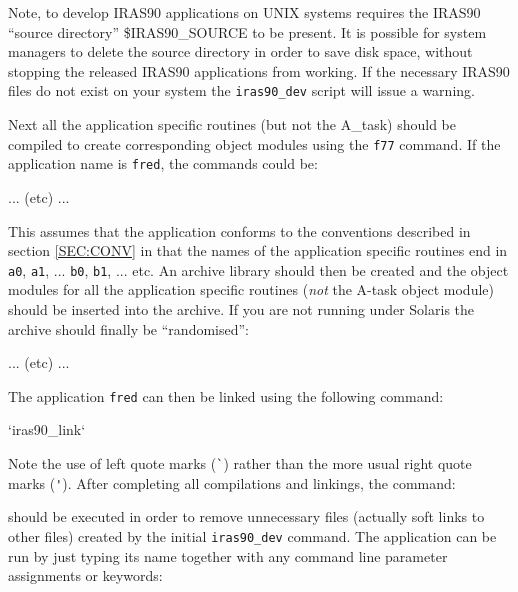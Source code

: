 \documentclass[twoside,11pt,nolof]{starlink}
\begin{document}
Note, to develop {\small IRAS90} applications on {\small UNIX} systems
requires the {\small IRAS90} ``source directory'' {\small \$IRAS90\_SOURCE}
to be present. It is possible for system managers
to delete the source directory in order to save disk space, without
stopping the released {\small IRAS90} applications from working. If the
necessary {\small IRAS90} files do not exist on your system the
\verb+iras90_dev+ script will issue a warning.


Next all the application specific routines (but not the {\small A\_task})
should be compiled to create corresponding object modules using the
\verb+f77+ command. If the application name is \verb+fred+, the commands
could be:

\small
\begin{terminalv}
 ...
 (etc)
 ...
\end{terminalv}
\normalsize

This assumes that the application conforms to the conventions described
in section \ref{SEC:CONV} in that the names of the application specific
routines end in \verb+a0+, \verb+a1+, ... \verb+b0+, \verb+b1+, ...
etc. An archive library should then be created and the object modules
for all the application specific routines (\emph{not} the A-task object
module) should be inserted into the archive. If you are not running under
Solaris the archive should finally be ``randomised'':

\small
\begin{terminalv}
 ...
 (etc)
 ...
\end{terminalv}
\normalsize

The application \verb+fred+ can then be linked using the following command:

\small
\begin{terminalv}
 `iras90_link`
\end{terminalv}
\normalsize

Note the use of left quote marks (\verb+`+) rather than the more usual right
quote marks (\verb+'+). After completing all compilations and linkings, the
command:

\small
\begin{terminalv}
\end{terminalv}
\normalsize

should be executed in order to remove unnecessary files (actually soft
links to other files) created by the initial \verb+iras90_dev+ command.
The application can be run by just typing its name together with any
command line parameter assignments or keywords:
\end{document}
